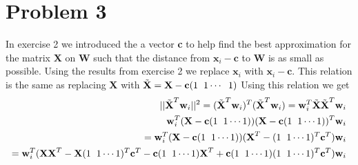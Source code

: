 \documentclass[a4paper,norsk]{article}
\begin{document}
\newpage

\section{Problem 3}
In exercise 2 we introduced the a vector \textbf{c} to help find the best approximation for the matrix \textbf{X} on \textbf{W} such that the distance from $\textbf{x}_i - \textbf{c}$ to \textbf{W} is as small
as possible. Using the results from exercise 2 we replace $\textbf{x}_i$ with $\textbf{x}_i - \textbf{c}$. This relation is the same as replacing \textbf{X} with 
$\tilde{\textbf{X}} = \textbf{X} - \textbf{c}(1 \hspace{2mm} 1 \cdots \hspace{2mm} 1)$ 
Using this relation we get 
\begin{align*}
||\tilde{\textbf{X}}^T \textbf{w}_i ||^2 = (\tilde{\textbf{X}}^T \textbf{w}_i)^T (\tilde{\textbf{X}}^T \textbf{w}_i) =  \textbf{w}_i^T \tilde{\textbf{X}} \tilde{\textbf{X}}^T \textbf{w}_i \\
\textbf{w}_i^T (\textbf{X} - \textbf{c} (1 \hspace{2mm} 1 \cdots 1 )  ) (\textbf{X} - \textbf{c} (1 \hspace{2mm} 1 \cdots 1))^T \textbf{w}_i \\=
\textbf{w}_i^T (\textbf{X} - \textbf{c} (1 \hspace{2mm} 1 \cdots 1 )  ) (\textbf{X}^T - (1 \hspace{2mm} 1 \cdots 1)^T \textbf{c}^T) \textbf{w}_i \\=
\textbf{w}_i^T (\textbf{X}\textbf{X}^T - \textbf{X}(1 \hspace{2mm} 1 \cdots 1)^T\textbf{c}^T - \textbf{c}(1 \hspace{2mm} 1 \cdots 1)\textbf{X}^T +
 \textbf{c}(1 \hspace{2mm} 1 \cdots 1)(1 \hspace{2mm} 1 \cdots 1)^T \textbf{c}^T )\textbf{w}_i 
\end{align*}
\end{document}
